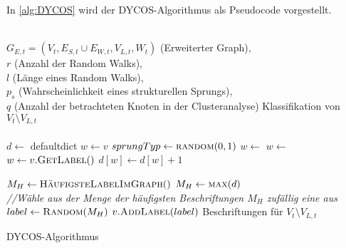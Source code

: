 In \cref{alg:DYCOS} wird der DYCOS-Algorithmus als 
Pseudocode vorgestellt.

\begin{algorithm}
    \begin{algorithmic}[1]
        \Require \\$G_{E,t} = (V_t, E_{S,t} \cup E_{W,t}, V_{L,t}, W_t)$ (Erweiterter Graph),\\
                 $r$ (Anzahl der Random Walks),\\
                 $l$ (Länge eines Random Walks),\\
                 $p_s$ (Wahrscheinlichkeit eines strukturellen Sprungs),\\
                 $q$ (Anzahl der betrachteten Knoten in der Clusteranalyse)
        \Ensure  Klassifikation von $V_t \setminus V_{L,t}$\\
        \\

            \State $d \gets $ defaultdict
                \State $w \gets v$
                    \State $sprungTyp \gets \Call{random}{0, 1}$
                        \State $w \gets$ 
                    \Else
                        \State $w \gets$ 
                    \EndIf
                    \State $w \gets v.\Call{GetLabel}{ }$ 
                    \State $d[w] \gets d[w] + 1$
                \EndFor
            \EndFor

             
                \State $M_H \gets \Call{HäufigsteLabelImGraph}{ }$
            \Else
                \State $M_H \gets \Call{max}{d}$
            \EndIf
            \\
            \State \textit{//Wähle aus der Menge der häufigsten Beschriftungen $M_H$ zufällig eine aus}
            \State $label \gets \Call{Random}{M_H}$ 
            \State $v.\Call{AddLabel}{label}$ 
        \EndFor
        \State \Return Beschriftungen für $V_t \setminus V_{L,t}$
    \end{algorithmic}
\caption{DYCOS-Algorithmus}
\label{alg:DYCOS}
\end{algorithm}

